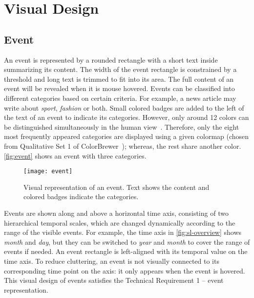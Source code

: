 \section{Visual Design}

\subsection{Event}
An event is represented by a rounded rectangle with a short text inside summarizing its content. The width of the event rectangle is constrained by a threshold and long text is trimmed to fit into its area. The full content of an event will be revealed when it is mouse hovered. Events can be classified into different categories based on certain criteria. For example, a news article may write about \emph{sport}, \emph{fashion} or both. Small colored badges are added to the left of the text of an event to indicate its categories. However, only around 12 colors can be distinguished simultaneously in the human view~\cite{Munzner2014}. Therefore, only the eight most frequently appeared categories are displayed using a given colormap (chosen from Qualitative Set 1 of  ColorBrewer~\cite{Harrower2003}); whereas, the rest share another color. \autoref{fig:event} shows an event with three categories.

\begin{figure}
\centering
\texttt{[image: event]}
\caption[Visual representation of an event]{Visual representation of an event. Text shows the content and colored badges indicate the categories.}
\label{fig:event}
\end{figure}

Events are shown along and above a horizontal time axis, consisting of two hierarchical temporal scales, which are changed dynamically according to the range of the visible events. For example, the time axis in \autoref{fig:sl-overview} shows \emph{month} and \emph{day}, but they can be switched to \emph{year} and \emph{month} to cover the range of events if needed. An event rectangle is left-aligned with its temporal value on the time axis. To reduce cluttering, an event is not visually connected to its corresponding time point on the axis: it only appears when the event is hovered. This visual design of events satisfies the Technical Requirement 1 -- event representation.

